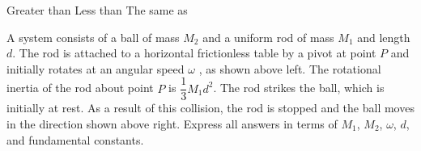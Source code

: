 \documentclass{../../oss-classkick-exam}
\begin{document}
\begin{questions}
\begin{parts}
    \vspace{.1in}   
    \underline{\hspace{.3in}} Greater than\hspace{.2in}
    \underline{\hspace{.3in}} Less than\hspace{.2in}
    \underline{\hspace{.3in}} The same as
  \end{parts}
  \newpage

  \question A system consists of a ball of mass $M_2$ and a uniform rod of mass
  $M_1$ and length $d$. The rod is attached to a horizontal frictionless table
  by a pivot at point $P$ and initially rotates at an angular speed $\omega$ ,
  as shown above left. The rotational inertia of the rod about point $P$ is
  $\dfrac13M_1d^2$. The rod strikes the ball, which is initially at rest. As a
  result of this collision, the rod is stopped and the ball moves in the
  direction shown above right. Express all answers in terms of $M_1$, $M_2$,
  $\omega$, $d$, and fundamental constants.
\end{questions}
\end{document}
